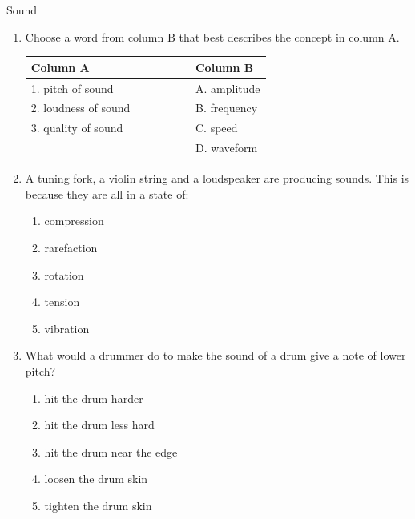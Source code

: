 \begin{eocexercises}{Sound}
            \nopagebreak
      \label{m38800*id185882}\begin{enumerate}[noitemsep, label=\textbf{\arabic*}. ] 
            \label{m38800*uid27}\item Choose a word from column B that best describes the concept in column A.
          \begin{center}
\begin{tabular}{ll}
\textbf{Column A} & \textbf{Column B} \\ \hline
1. pitch of sound \ \ \ & A. amplitude \\
2. loudness of sound \ \ \ \ \ \ \ \ \ & B. frequency \\
3. quality of sound \ \ \ & C. speed \\
& D. waveform \\
\end{tabular}
\end{center}
    \par
          \label{m38800*uid28}\item A tuning fork, a violin string and a loudspeaker are producing sounds. This is because they are all in a state of:
\label{m38800*id185988}\begin{enumerate}[noitemsep, label=\textbf{\alph*}. ] 
            \label{m38800*uid29}\item compression
\label{m38800*uid30}\item rarefaction
\label{m38800*uid31}\item rotation
\label{m38800*uid32}\item tension
\label{m38800*uid33}\item vibration
\end{enumerate}
                \label{m38800*uid34}\item What would a drummer do to make the sound of a drum give a note of lower pitch?
\label{m38800*id186066}\begin{enumerate}[noitemsep, label=\textbf{\alph*}. ] 
            \label{m38800*uid35}\item hit the drum harder
\label{m38800*uid36}\item hit the drum less hard
\label{m38800*uid37}\item hit the drum near the edge
\label{m38800*uid38}\item loosen the drum skin
\label{m38800*uid39}\item tighten the drum skin

\end{enumerate}
\end{enumerate}
\end{eocexercises}
